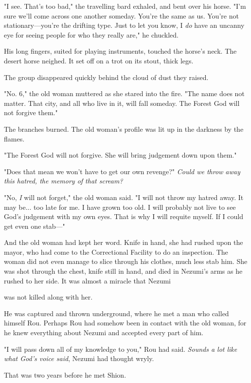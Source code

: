 "I see. That's too bad," the travelling bard exhaled, and bent over his
horse. "I'm sure we'll come across one another someday. You're the same
as us. You're not stationary---you're the drifting type. Just to let you
know, I \emph{do} have an uncanny eye for seeing people for who they really
are," he chuckled.

His long fingers, suited for playing instruments, touched the horse's
neck. The desert horse neighed. It set off on a trot on its stout, thick
legs.

The group disappeared quickly behind the cloud of dust they raised.

"No. 6," the old woman muttered as she stared into the fire. "The name
does not matter. That city, and all who live in it, will fall someday.
The Forest God will not forgive them."

The branches burned. The old woman's profile was lit up in the darkness
by the flames.

"The Forest God will not forgive. She will bring judgement down upon
them."

"Does that mean we won't have to get our own revenge?" \emph{Could we throw
away this hatred, the memory of that scream?}

"No, \emph{I} will not forget," the old woman said. "I will not throw my hatred
away. It may be... too late for me. I have grown too old. I will
probably not live to see God's judgement with my own eyes. That is why I
will requite myself. If I could get even one stab---"

And the old woman had kept her word. Knife in hand, she had rushed upon
the mayor, who had come to the Correctional Facility to do an
inspection. The woman did not even manage to slice through his clothes,
much less stab him. She was shot through the chest, knife still in hand,
and died in Nezumi's arms as he rushed to her side. It was almost a
miracle that Nezumi~

was not killed along with her.

He was captured and thrown underground, where he met a man who called
himself Rou. Perhaps Rou had somehow been in contact with the old woman,
for he knew everything about Nezumi and accepted every part of him.

"I will pass down all of my knowledge to you," Rou had said. \emph{Sounds a
lot like what God's voice said}, Nezumi had thought wryly.

That was two years before he met Shion.

\myspace

